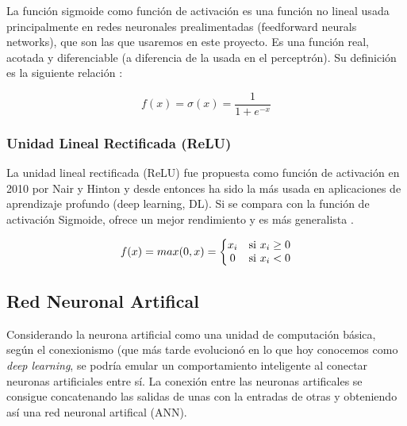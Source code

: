 La función sigmoide como función de activación es una función no lineal usada principalmente en redes neuronales prealimentadas (feedforward neurals networks), que son las que usaremos en este proyecto. Es una función real, acotada y diferenciable (a diferencia de la usada en el perceptrón). Su definición es la siguiente relación \cite{nwankpa2018activation}:

\begin{equation}
 f(x) = \sigma (x) = \frac{1}{1+e^{-x}}
\end{equation}

\subsubsection{Unidad Lineal Rectificada (ReLU)}\label{subsubsec:relu}

La unidad lineal rectificada (ReLU) fue propuesta como función de activación en 2010 por Nair y Hinton \cite{Nair2010} y desde entonces ha sido la más usada en aplicaciones de aprendizaje profundo (deep learning, DL). Si se compara con la función de activación Sigmoide, ofrece un mejor rendimiento y es más generalista \cite{nwankpa2018activation}.

\begin{equation}
 f(x) = max(0, x)=\left\{\begin{matrix}
 x_i & $si $ x_i \geq 0 \\ 
 0 & $si $ x_i < 0
\end{matrix}\right.
\end{equation}

\subsection{Red Neuronal Artifical}\label{subsec:neural_network}

Considerando la neurona artificial como una unidad de computación básica, según el conexionismo (que más tarde evolucionó en lo que hoy conocemos como \textit{deep learning}, se podría emular un comportamiento inteligente al conectar neuronas artificiales entre sí. La conexión entre las neuronas artificales se consigue concatenando las salidas de unas con la entradas de otras y obteniendo así una red neuronal artifical (ANN).


